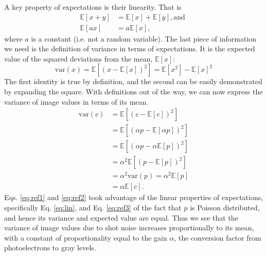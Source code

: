 \documentclass[a4paper]{report}
\begin{document}
A key property of expectations is their linearity. That is
\begin{align}
\mathbb{E}[x+y] &= \mathbb{E}[x] + \mathbb{E}[y], \textrm{and } \\
\mathbb{E}[ax] & = a \mathbb{E}[x], \label{eq:lin}
\end{align}
where $a$ is a constant (i.e. not a random variable). The last piece of information we need is the definition of variance in terms of expectations. It is the expected value of the squared deviations from the mean, $\mathbb{E}[x]$:
\begin{equation}
	\mathrm{var}(x) = \mathbb{E}[(x - \mathbb{E}[x])^2] = \mathbb{E}[x^2] - \mathbb{E}[x]^2
\end{equation}
The first identity is true by definition, and the second can be easily demonstrated by expanding the square. With definitions out of the way, we can now express the variance of image values in terms of its mean.
\begin{align}
	\mathrm{var}(c) & = \mathbb{E}[(c - \mathbb{E}[c])^2] \\
	& = \mathbb{E}[(\alpha p - \mathbb{E}[\alpha p])^2] \\ 
	& = \mathbb{E}[(\alpha p - \alpha \mathbb{E}[p] )^2] \label{eq:ref1} \\ 
	& = \alpha^2 \mathbb{E}[(p - \mathbb{E}[p])^2] \label{eq:ref2} \\ 
	& = \alpha^2 \mathrm{var}(p) = \alpha^2 \mathbb{E}[p] \label{eq:ref3} \\
	& = \alpha\mathbb{E}[c].
\end{align}
Eqs. \ref{eq:ref1} and \ref{eq:ref2} took advantage of the linear properties of expectations, specifically Eq. \ref{eq:lin}, and Eq. \ref{eq:ref3} of the fact that $p$ is Poisson distributed, and hence its variance and expected value are equal. Thus we see that the variance of image values due to shot noise increases proportionally to its mean, with a constant of proportionality equal to the gain $\alpha$, the conversion factor from photoelectrons to gray levels.
\end{document}
